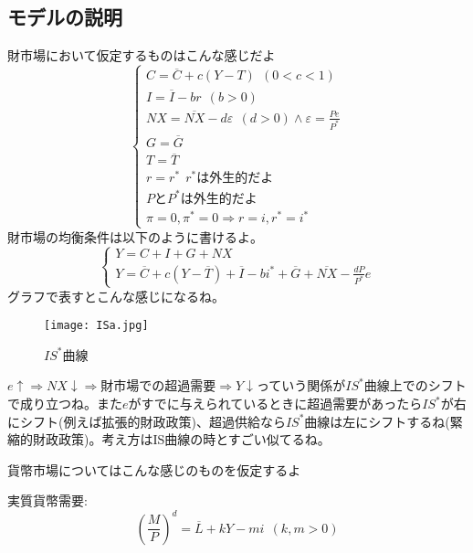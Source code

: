 \documentclass[a4paper, 12pt]{article}
\begin{document}
\subsection{モデルの説明}
財市場において仮定するものはこんな感じだよ
\begin{displaymath}
  \left\{\begin{array}{l}
    \displaystyle C=\overline{C}+c(Y-T) \ \ (0<c<1)\\
    \displaystyle I=\overline{I}-br \ \ (b > 0)\\
    \displaystyle NX=\overline{NX}-d\varepsilon \ \ (d > 0) \land \varepsilon = \frac{Pe}{P^*}\\
    \displaystyle G=\overline{G}\\
    \displaystyle T=\overline{T}\\
    \displaystyle r = r^* \ \  r^* \text{は外生的だよ}\\
    \displaystyle P \text{と} P^* \text{は外生的だよ}\\
    \displaystyle \pi = 0, \pi^* = 0 \Rightarrow r=i, r^*=i^*
  \end{array}\right.
\end{displaymath}
財市場の均衡条件は以下のように書けるよ。
\begin{displaymath}
  \left\{\begin{array}{l}
    \displaystyle Y=C+I+G+NX \\
    \displaystyle Y = \overline{C}+c(Y-\overline{T})+\overline{I}-bi^*+\overline{G}+\overline{NX}-\frac{dP}{P^*}e
  \end{array}\right.
\end{displaymath}
グラフで表すとこんな感じになるね。
\begin{figure}[h]
\begin{center}
\texttt{[image: ISa.jpg]}
\caption{$IS^*$曲線}
\label{}
\end{center}
\end{figure}

$e \uparrow \Rightarrow NX \downarrow \Rightarrow$財市場での超過需要$\Rightarrow Y\downarrow$っていう関係が$IS^*$曲線上でのシフトで成り立つね。また$e$がすでに与えられているときに超過需要があったら$IS^*$が右にシフト(例えば拡張的財政政策)、超過供給なら$IS^*$曲線は左にシフトするね(緊縮的財政政策)。考え方はIS曲線の時とすごい似てるね。

貨幣市場についてはこんな感じのものを仮定するよ

実質貨幣需要:
\begin{equation*}
  \left(\frac{M}{P}\right)^d=\overline{L}+kY-mi \ \ (k,m > 0)
\end{equation*}
\end{document}
